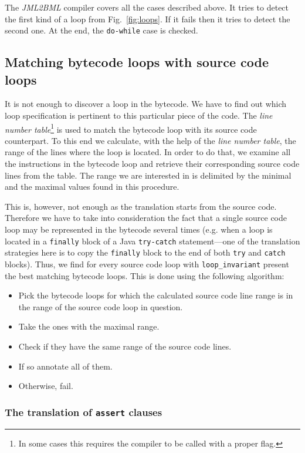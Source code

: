 \documentclass{llncs}
\newcommand{\jmltobmltext}{JML2BML}
\newcommand{\jmltobml}{\textsl{\jmltobmltext}\xspace}
\newcommand{\hs}{\hspace{0.5pt}}
\begin{document}
The \jmltobml compiler covers all the cases described above. It tries
to detect the first kind of a loop from Fig.~\ref{fig:loops}. If it
fails then it tries to detect the second one. At the end, the
\texttt{do-while} case is checked. 

\subsection{Matching bytecode loops with source code loops}
\label{sec:matching}

It is not enough to discover a loop in the bytecode. We have to find
out which loop specification is pertinent to this particular piece of
the code. The \emph{line number table}\footnote{In some cases this
requires the compiler to be called with a proper flag.} is used to
match the bytecode loop with its source code counterpart. To this end
we calculate, with the help of the \emph{line number table}, the range
of the lines where the loop is located. In order to do that, we
examine all the instructions in the bytecode loop and retrieve their 
corresponding source code lines from the table. The range
we are interested in is delimited by the minimal and the maximal values
found in this procedure.

This is, however, not enough as the translation starts from the source
code. Therefore we have to take into consideration the fact that a
single source code loop may be represented in the bytecode several
times (e.g.  when a loop is located in a \texttt{finally} block of a
Java \texttt{try-catch} statement\hs{}---\hs{}one of the translation
strategies here is to copy the \texttt{finally} block to the end of
both \texttt{try} and \texttt{catch} blocks). Thus, we find for every
source code loop with \texttt{loop\_invariant} present the best
matching bytecode loops. This is done using the following algorithm:
\begin{itemize}
\item Pick the bytecode loops for which the calculated source code
  line range is in the range of the source code loop in question.
\item Take the ones with the maximal range.
\item Check if they have the same range of the source code lines.
\item If so annotate all of them.
\item Otherwise, fail.
\end{itemize}

\subsubsection*{The translation of \texttt{assert} clauses}
\end{document}
